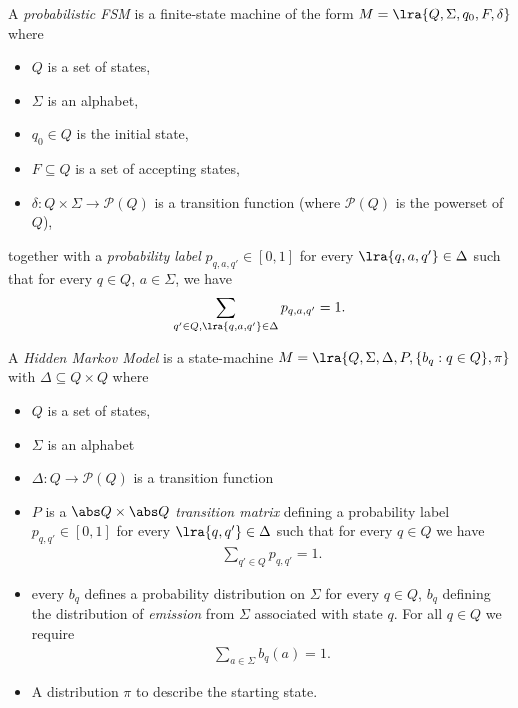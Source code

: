 \documentclass{article}
\begin{document}
\begin{definition}[L19]
	A \emph{probabilistic FSM} is a finite-state machine of the form
	$M=\lra{Q, \Sigma, q_0, F, \delta}$ where
	\begin{itemize}
		\item $Q$ is a set of states,
		\item $\Sigma$ is an alphabet,
		\item $q_0\in Q$ is the initial state,
		\item $F\subseteq Q$ is a set of accepting states,
		\item $\delta:Q\times \Sigma \to\mathcal{P}(Q)$ is a transition function
		      (where $\mathcal{P}(Q)$ is the powerset of $Q$),
	\end{itemize}
	together with a \emph{probability label} $p_{q,a,q'}\in[0,1]$ for every
	$\lra{q,a,q'}\in\Delta$ such that for every $q\in Q$, $a\in\Sigma$, we have
	\begin{align*}
		\sum_{q'\in Q, \lra{q,a,q'}\in\Delta} p_{q,a,q'}=1.
	\end{align*}
\end{definition}

\begin{definition}[L19]
	A \emph{Hidden Markov Model} is a state-machine $M=\lra{Q, \Sigma, \Delta, P,
			\{b_q:q\in Q\}, \pi}$ with $\Delta\subseteq Q\times Q$ where
	\begin{itemize}
		\item $Q$ is a set of states,
		\item $\Sigma$ is an alphabet
		\item $\Delta:Q\to\mathcal{P}(Q)$ is a transition function
		\item $P$ is a $\abs Q \times \abs Q$ \emph{transition matrix}
		      defining a probability label $p_{q,q'}\in[0,1]$ for every
		      $\lra{q,q'}\in\Delta$ such that for every $q\in Q$ we have
		      \begin{align*}
			      \sum_{q'\in Q}p_{q,q'} = 1.
		      \end{align*}
		\item every $b_q$ defines a probability distribution on $\Sigma$
		      for every $q\in Q$, $b_q$ defining the distribution of
		      \emph{emission} from $\Sigma$ associated with state $q$. For all
		      $q\in Q$ we require \begin{align*}
			      \sum_{a\in\Sigma} b_q(a) = 1.
		      \end{align*}
		\item A distribution $\pi$ to describe the starting state.
	\end{itemize}
\end{definition}
\end{document}
